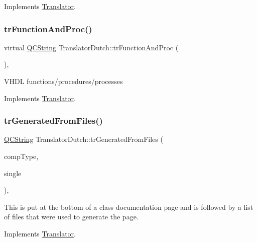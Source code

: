Implements \mbox{\hyperlink{class_translator}{Translator}}.

\mbox{\label{class_translator_dutch_aa297740cb7537de418e24e2386c19d5f}} 
\subsubsection{\texorpdfstring{trFunctionAndProc()}{trFunctionAndProc()}}
{\footnotesize\ttfamily virtual \mbox{\hyperlink{class_q_c_string}{Q\+C\+String}} Translator\+Dutch\+::tr\+Function\+And\+Proc (\begin{DoxyParamCaption}{ }\end{DoxyParamCaption})\hspace{0.3cm}{\ttfamily [inline]}, {\ttfamily [virtual]}}

V\+H\+DL functions/procedures/processes 

Implements \mbox{\hyperlink{class_translator}{Translator}}.

\mbox{\label{class_translator_dutch_a07117d7d48aa34302259b1645a1c8c42}} 
\subsubsection{\texorpdfstring{trGeneratedFromFiles()}{trGeneratedFromFiles()}}
{\footnotesize\ttfamily \mbox{\hyperlink{class_q_c_string}{Q\+C\+String}} Translator\+Dutch\+::tr\+Generated\+From\+Files (\begin{DoxyParamCaption}\item[{\mbox{\hyperlink{class_class_def_ae70cf86d35fe954a94c566fbcfc87939}{Class\+Def\+::\+Compound\+Type}}}]{comp\+Type,  }\item[{bool}]{single }\end{DoxyParamCaption})\hspace{0.3cm}{\ttfamily [inline]}, {\ttfamily [virtual]}}

This is put at the bottom of a class documentation page and is followed by a list of files that were used to generate the page. 

Implements \mbox{\hyperlink{class_translator}{Translator}}.

